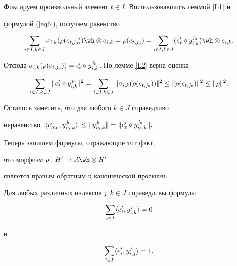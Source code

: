 \begin{pf}


Фиксируем произвольный элемент $t \in I$. Воспользовавшись леммой \ref{L1} и


формулой (\ref{eq6}), получаем равенство


$$


\sumik \si_{i,k}(\rho (e_{t,j_0}))


\tens e_{i,k} =\rho (e_{t,j_0})=\sumik (e'_t \dia


y^{j_0}_{i,k}) \tens e_{i,k}.


$$


Отсюда $\si_{i,k}(\rho (e_{t,j_0}))=


e'_t \dia y^{j_0}_{i,k}$. По лемме \ref{L2} верна оценка


$$


\sumik \| e'_t \dia y^{j_0}_{i,k} \|^2 =


\sumik \| \si_{i,k} (\rho (e_{t,j_0}))\|^2 \le \| \rho (e_{t,j_0}) \|^2 \le


\| \rho \|^2.


$$


Осталось заметить, что для любого $k \in J$ справедливо


неравенство $| \lan e'_{m_0},y^{j_0}_{i_0,k} \ran | \le \| y^{j_0}_{i_0,k}


\| = \| e'_t \dia y^{j_0}_{i_0,k}\|.$


\end{pf}





Теперь запишем формулы, отражающие тот факт, 


что морфизм $\rho :H' \to A \tens H'$


является правым обратным к канонической проекции.





\begin{lem}\label{L7}


Для любых различных индексов $j,k \in J$ справедливы формулы


$$


\sumi \lan e'_i,y^j_{i,k} \ran =0


$$


и


$$


\sumi \lan e'_i,y^j_{i,j} \ran =1.


$$


\end{lem}





